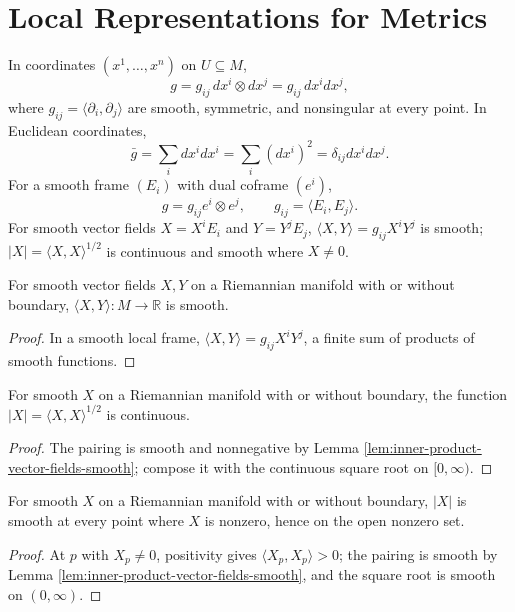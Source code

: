 \section{Local Representations for Metrics}

In coordinates $(x^1,\ldots,x^n)$ on $U\subseteq M$,
\[
g=g_{ij}\,dx^i\otimes dx^j=g_{ij}\,dx^i dx^j,\tag{2.7}
\]
where $g_{ij}=\langle\partial_i,\partial_j\rangle$ are smooth, symmetric, and nonsingular at every point. In Euclidean coordinates,
\[
\bar g=\sum_i dx^i dx^i=\sum_i(dx^i)^2=\delta_{ij}dx^i dx^j.\tag{2.8}
\]
For a smooth frame $(E_i)$ with dual coframe $(e^i)$,
\[
g=g_{ij}e^i\otimes e^j,\qquad g_{ij}=\langle E_i,E_j\rangle.\tag{2.9}
\]
For smooth vector fields $X=X^iE_i$ and $Y=Y^jE_j$, $\langle X,Y\rangle=g_{ij}X^iY^j$ is smooth; $|X|=\langle X,X\rangle^{1/2}$ is continuous and smooth where $X\ne0$.

\begin{lemma}
\label{lem:inner-product-vector-fields-smooth}
\leanok
{}
For smooth vector fields $X,Y$ on a Riemannian manifold with or without boundary, $\langle X,Y\rangle:M\to\mathbb R$ is smooth.
\end{lemma}
\begin{proof}
\leanok
{}
\sketch In a smooth local frame, $\langle X,Y\rangle=g_{ij}X^iY^j$, a finite sum of products of smooth functions.
\end{proof}

\begin{lemma}
\label{lem:length-vector-field-continuous}
\leanok
{}
For smooth $X$ on a Riemannian manifold with or without boundary, the function $|X|=\langle X,X\rangle^{1/2}$ is continuous.
\end{lemma}
\begin{proof}
\leanok
{}
\sketch The pairing is smooth and nonnegative by Lemma \ref{lem:inner-product-vector-fields-smooth}; compose it with the continuous square root on $[0,\infty)$.
\end{proof}

\begin{lemma}
\label{lem:length-vector-field-smooth}
\leanok
{}
For smooth $X$ on a Riemannian manifold with or without boundary, $|X|$ is smooth at every point where $X$ is nonzero, hence on the open nonzero set.
\end{lemma}
\begin{proof}
\leanok
{}
\sketch At $p$ with $X_p\ne0$, positivity gives $\langle X_p,X_p\rangle>0$; the pairing is smooth by Lemma \ref{lem:inner-product-vector-fields-smooth}, and the square root is smooth on $(0,\infty)$.
\end{proof}

